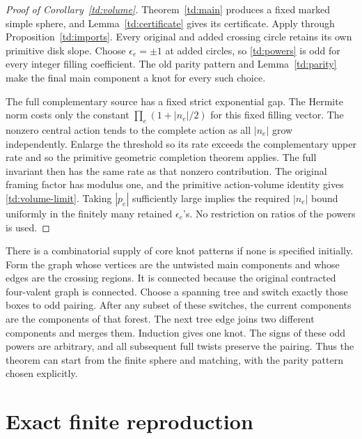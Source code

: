 \documentclass[11pt]{article}
\numberwithin{equation}{section}
\theoremstyle{definition}
\begin{document}
\begin{proof}[Proof of Corollary~\ref{td:volume}]
Theorem~\ref{td:main} produces a fixed marked simple sphere, and
Lemma~\ref{td:certificate} gives its certificate.
Apply \cite[Theorem 1.1]{Planar} through
Proposition~\ref{td:imports}. Every original and added crossing
circle retains its own primitive disk slope. Choose
\(\epsilon_e=\pm1\) at added circles, so \eqref{td:powers}
is odd for every integer filling coefficient. The old parity
pattern and Lemma~\ref{td:parity} make the final main component
a knot for every such choice.

The full complementary source has a fixed strict exponential
gap. The Hermite norm costs only the constant
\(\prod_e(1+|n_e|/2)\) for this fixed filling vector. The nonzero
central action tends to the complete action as all \(|n_e|\)
grow independently. Enlarge the threshold so its rate exceeds
the complementary upper rate and so the primitive geometric
completion theorem applies. The full invariant then has the
same rate as that nonzero contribution. The original framing
factor has modulus one, and the primitive action-volume
identity gives \eqref{td:volume-limit}.
Taking \(|p_e|\) sufficiently large implies the required
\(|n_e|\) bound uniformly in the finitely many retained
\(\epsilon_e\)'s. No restriction on ratios of the powers is used.
\end{proof}

There is a combinatorial supply of core knot patterns if none is
specified initially. Form the graph whose vertices are the
untwisted main components and whose edges are the crossing
regions. It is connected because the original contracted
four-valent graph is connected. Choose a spanning tree and switch
exactly those boxes to odd pairing. After any subset of these
switches, the current components are the components of that
forest. The next tree edge joins two different components and
merges them. Induction gives one knot. The signs of these odd
powers are arbitrary, and all subsequent full twists preserve
the pairing. Thus the theorem can start from the finite sphere
and matching, with the parity pattern chosen explicitly.

\section{Exact finite reproduction}
\end{document}
